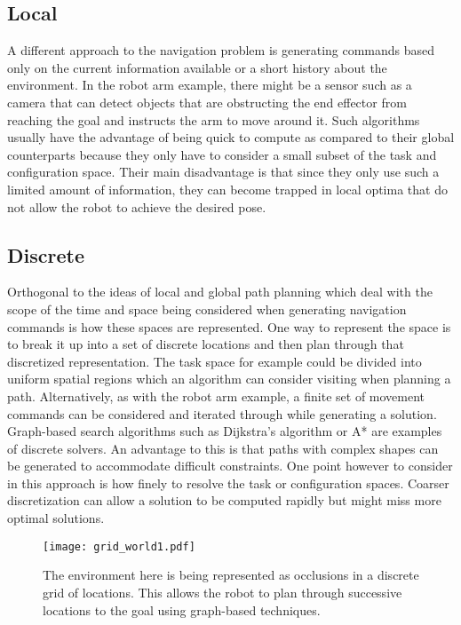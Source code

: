 \subsection{Local}
A different approach to the navigation problem is generating commands based only on the current information available 
or a short history about the environment. In the robot arm example, there might be a sensor such as a camera that
can detect objects that are obstructing the end effector from reaching the goal and instructs the arm to move around it.
Such algorithms usually have the advantage of being quick to compute as compared to their global counterparts because
they only have to consider a small subset of the task and configuration space. Their main disadvantage is that since they
only use such a limited amount of information, they can become trapped in local optima that do not allow the robot 
to achieve the desired pose.

\subsection{Discrete}
Orthogonal to the ideas of local and global path planning which deal with the scope of the time and space being considered
when generating navigation commands is how these spaces are represented. One way to represent the space is to break it
up into a set of discrete locations and then plan through that discretized representation. The task space for example could be divided into uniform 
spatial regions which an algorithm can consider visiting when planning a path. Alternatively, as with the robot arm example,
a finite set of movement commands can be considered and iterated through while generating a solution. 
Graph-based search algorithms such as  Dijkstra's algorithm or A* are examples of discrete solvers.
An advantage to this is that paths with complex shapes can be generated to accommodate difficult constraints. 
One point however to consider in this approach is how finely to resolve the task or configuration spaces. 
Coarser discretization can allow a solution to be computed rapidly but might miss more optimal solutions. 
\begin{figure}
\centering
\texttt{[image: grid\_world1.pdf]}
\caption{The environment here is being represented as occlusions in a 
         discrete grid of locations. This allows the robot to plan through
         successive locations to the goal using graph-based techniques.}
\label{fig:grid_world1}
\end{figure}

